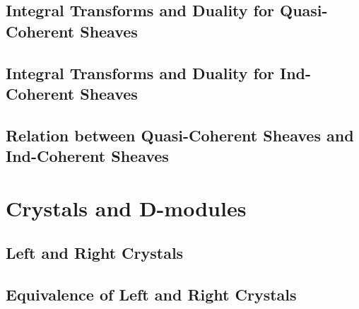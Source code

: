 \documentclass{article}
\begin{document}

  \subsection{Integral Transforms and Duality for Quasi-Coherent Sheaves}
    

  \subsection{Integral Transforms and Duality for Ind-Coherent Sheaves}
    

  \subsection{Relation between Quasi-Coherent Sheaves and Ind-Coherent Sheaves}
    

\section{Crystals and D-modules}\label{crys}


  \subsection{Left and Right Crystals}

  \subsection{Equivalence of Left and Right Crystals}
\end{document}
